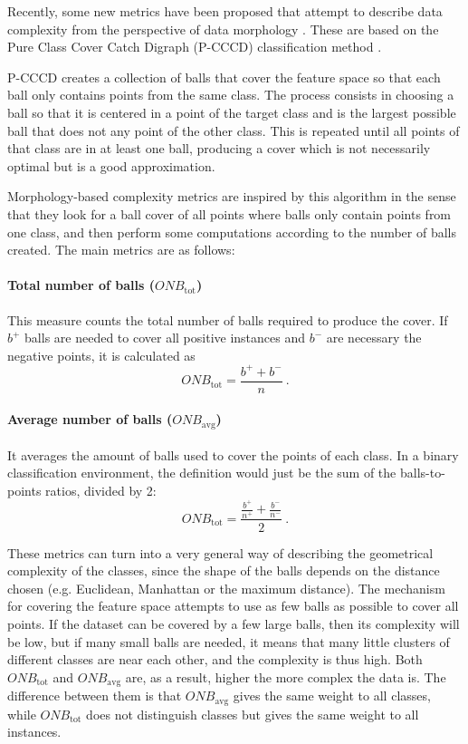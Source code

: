 Recently, some new metrics have been proposed that attempt to describe data complexity from the perspective of data morphology \cite{pascual2020revisiting}. These are based on the Pure Class Cover Catch Digraph (P-CCCD) classification method \cite{pcccd}.

P-CCCD creates a collection of balls that cover the feature space so that each ball only contains points from the same class. The process consists in choosing a ball so that it is centered in a point of the target class and is the largest possible ball that does not any point of the other class. This is repeated until all points of that class are in at least one ball, producing a cover which is not necessarily optimal but is a good approximation.

Morphology-based complexity metrics are inspired by this algorithm in the sense that they look for a ball cover of all points where balls only contain points from one class, and then perform some computations according to the number of balls created. The main metrics are as follows:

\paragraph*{Total number of balls ($\textit{ONB}_{\text{tot}}$)} This measure counts the total number of balls required to produce the cover. If $b^+$ balls are needed to cover all positive instances and $b^-$ are necessary  the negative points, it is calculated as \begin{equation}\textit{ONB}_{\text{tot}}=\frac{b^++b^-}{n}~.\end{equation}
\paragraph*{Average number of balls ($\textit{ONB}_{\text{avg}}$)}  It averages the amount of balls used to cover the points of each class. In a binary classification environment, the definition would just be the sum of the balls-to-points ratios, divided by 2: \begin{equation}\textit{ONB}_{\text{tot}}=\frac{\frac{b^+}{n^+}+\frac{b^-}{n^-}}{2}~.\end{equation}


These metrics can turn into a very general way of describing the geometrical complexity of the classes, since the shape of the balls depends on the distance chosen (e.g. Euclidean, Manhattan or the maximum distance). The mechanism for covering the feature space attempts to use as few balls as possible to cover all points. If the dataset can be covered by a few large balls, then its complexity will be low, but if many small balls are needed, it means that many little clusters of different classes are near each other, and the complexity is thus high. Both $\textit{ONB}_{\text{tot}}$ and $\textit{ONB}_{\text{avg}}$ are, as a result, higher the more complex the data is. The difference between them is that $\textit{ONB}_{\text{avg}}$ gives the same weight to all classes, while $\textit{ONB}_{\text{tot}}$ does not distinguish classes but gives the same weight to all instances.



